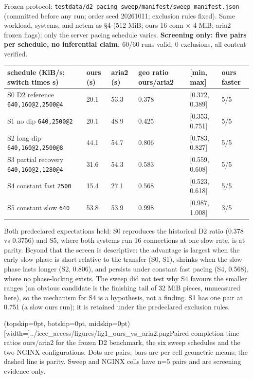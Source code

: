 \documentclass{ieeeaccess}
\begin{document}
Frozen protocol: \texttt{testdata/\allowbreak{}d2\_pacing\_sweep/\allowbreak{}manifest/\allowbreak{}sweep\_manifest.json} (committed before any run; order seed 20261011; exclusion rules fixed). Same workload, systems, and netem as §4 (512 MiB; ours 16 conn × 4 MiB; aria2 frozen flags); only the server pacing schedule varies. \textbf{Screening only: five pairs per schedule, no inferential claim.} 60/60 runs valid, 0 exclusions, all content-verified.


\begin{table}[!t]\centering\scriptsize
\begin{tabularx}{\textwidth}{@{}LLLLLL@{}}
\toprule
\textbf{schedule (KiB/s; switch times s)} & \textbf{ours (s)} & \textbf{aria2 (s)} & \textbf{geo ratio ours/aria2} & \textbf{[min, max]} & \textbf{ours faster}\\
\midrule
S0 D2 reference \texttt{640,160@2,2500@4} & 20.1 & 53.3 & 0.378 & [0.372, 0.389] & 5/5\\
S1 no dip \texttt{640,2500@2} & 20.1 & 48.9 & 0.425 & [0.353, 0.751] & 5/5\\
S2 long dip \texttt{640,160@2,2500@8} & 44.1 & 54.7 & 0.806 & [0.783, 0.827] & 5/5\\
S3 partial recovery \texttt{640,160@2,1280@4} & 31.6 & 54.3 & 0.583 & [0.559, 0.608] & 5/5\\
S4 constant fast \texttt{2500} & 15.4 & 27.1 & 0.568 & [0.523, 0.618] & 5/5\\
S5 constant slow \texttt{640} & 53.8 & 53.9 & 0.998 & [0.987, 1.008] & 3/5\\
\bottomrule
\end{tabularx}
\end{table}


Both predeclared expectations held: S0 reproduces the historical D2 ratio (0.378 vs 0.3756) and S5, where both systems run 16 connections at one slow rate, is at parity. Beyond that the screen is descriptive: the advantage is largest when the early slow phase is short relative to the transfer (S0, S1), shrinks when the slow phase lasts longer (S2, 0.806), and persists under constant fast pacing (S4, 0.568), where no phase-locking exists. The sweep did not test why S4 favours the smaller ranges (an obvious candidate is the finishing tail of 32 MiB pieces, unmeasured here), so the mechanism for S4 is a hypothesis, not a finding. S1 has one pair at 0.751 (a slow ours run); it is retained under the predeclared exclusion rules.


\Figure[t!](topskip=0pt, botskip=0pt, midskip=0pt)[width=\columnwidth]{../ieee_access/figures/fig1_ours_vs_aria2.png}{Paired completion-time ratios ours/aria2 for the frozen D2 benchmark, the six sweep schedules and the two NGINX configurations. Dots are pairs; bars are per-cell geometric means; the dashed line is parity. Sweep and NGINX cells have n=5 pairs and are screening evidence only.}
\end{document}
